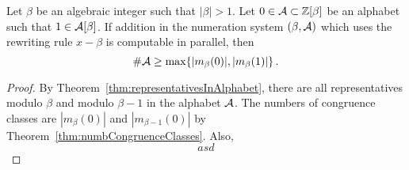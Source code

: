\begin{thm}
Let $\beta$ be an algebraic integer such that $|\beta|>1$. Let $0\in \mathcal{A}\subset \mathbb{Z}[\beta]$ be an alphabet such that $1\in \mathcal{A}[\beta]$. If addition in the numeration system $(\beta, \mathcal{A})$ which uses the rewriting rule $x-\beta$ is computable in parallel, then
$$
\#\mathcal{A} \geq \max \{|m_\beta(0)|, |m_\beta(1)|\}\,.
$$
\end{thm}
\begin{proof}
By Theorem~\ref{thm:representativesInAlphabet}, there are all representatives modulo $\beta$ and modulo $\beta-1$ in the alphabet $\mathcal{A}$. The numbers of congruence classes are $|m_\beta(0)|$ and $|m_{\beta-1}(0)|$ by Theorem~\ref{thm:numbCongruenceClasses}. Also,
$$
asd
$$
\end{proof}


